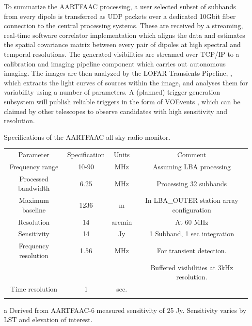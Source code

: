 \documentclass{ws-jai}
\begin{document}
To summarize  the AARTFAAC processing, a  user selected subset of  subbands from
every  dipole is  transferred  as  UDP packets  over  a  dedicated 10Gbit  fiber
connection  to  the  central  processing  systems.   These  are  received  by  a
streaming, real-time  software correlator  implementation which aligns  the data
and estimates  the spatial covariance  matrix between  every pair of  dipoles at
high spectral and temporal resolutions.  The generated visibilities are streamed
over TCP/IP  to a calibration and  imaging pipeline component which  carries out
autonomous  imaging.  The  images  are  then analyzed  by  the LOFAR  Transients
Pipeline, \citep[TraP;][]{swinbank2015lofar}, which extracts the light curves of
sources within  the image, and analyses  them for variability using  a number of
parameters.   A (planned)  trigger  generation subsystem  will publish  reliable
triggers  in  the form  of  VOEvents  \cite{williams2006voevent}, which  can  be
claimed  by other  telescopes to  observe candidates  with high  sensitivity and
resolution.



\begin{wstable}[h]
\caption{Specifications of the AARTFAAC all-sky radio monitor.}
\begin{tabular}{@{}cccc@{}} \toprule
Parameter & Specification & Units & Comment\\ \colrule
Frequency range & 10-90 & MHz & Assuming LBA processing  \\
Processed bandwidth & 6.25 & MHz & Processing 32 subbands \\
Maximum baseline & 1236 & m & In LBA\_OUTER station array configuration\\
Resolution & 14 & arcmin & At 60 MHz \\
Sensitivity & 14\tnote{a} & Jy & 1 Subband, 1 sec integration \\
Frequency resolution & 1.56 & MHz & For transient detection. \\
 & & & Buffered visibilities at 3kHz resolution.\\
Time resolution & 1 & sec.\\ \colrule

\end{tabular}
\begin{tablenotes}
\item[a] Derived from AARTFAAC-6 measured sensitivity of 25 Jy. Sensitivity varies by LST and elevation of interest.
\end{tablenotes}
\label{tab:afaac_specs}
\end{wstable}
\end{document}
